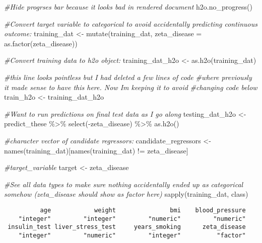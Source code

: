 \documentclass[
]{article}
\newenvironment{Shaded}{\begin{snugshade}}{\end{snugshade}}
\newcommand{\AttributeTok}[1]{\textcolor[rgb]{0.77,0.63,0.00}{#1}}
\newcommand{\CommentTok}[1]{\textcolor[rgb]{0.56,0.35,0.01}{\textit{#1}}}
\newcommand{\FunctionTok}[1]{\textcolor[rgb]{0.00,0.00,0.00}{#1}}
\newcommand{\NormalTok}[1]{#1}
\newcommand{\OtherTok}[1]{\textcolor[rgb]{0.56,0.35,0.01}{#1}}
\newcommand{\SpecialCharTok}[1]{\textcolor[rgb]{0.00,0.00,0.00}{#1}}
\newcommand{\StringTok}[1]{\textcolor[rgb]{0.31,0.60,0.02}{#1}}
\begin{document}
\begin{Shaded}
\begin{Highlighting}[]
\CommentTok{\#Hide progrses bar because it looks bad in rendered document}
\FunctionTok{h2o.no\_progress}\NormalTok{()}

\CommentTok{\#Convert target variable to categorical to avoid accidentally predicting continuous outcome:}
\NormalTok{training\_dat }\OtherTok{\textless{}{-}} \FunctionTok{mutate}\NormalTok{(training\_dat, }\AttributeTok{zeta\_disease =} \FunctionTok{as.factor}\NormalTok{(zeta\_disease))}

\CommentTok{\#Convert training data to h2o object:}
\NormalTok{training\_dat\_h2o  }\OtherTok{\textless{}{-}} \FunctionTok{as.h2o}\NormalTok{(training\_dat)}


\CommentTok{\#this line looks pointless but I had deleted a few lines of code }
\CommentTok{\#where previously it made sense to have this here. Now I\textquotesingle{}m keeping it to avoid}
\CommentTok{\#changing code below}
\NormalTok{train\_h2o }\OtherTok{\textless{}{-}}\NormalTok{ training\_dat\_h2o}


\CommentTok{\#Want to run predictions on final test data as I go along}
\NormalTok{testing\_dat\_h2o }\OtherTok{\textless{}{-}}\NormalTok{ predict\_these }\SpecialCharTok{\%\textgreater{}\%}
  \FunctionTok{select}\NormalTok{(}\SpecialCharTok{{-}}\NormalTok{zeta\_disease) }\SpecialCharTok{\%\textgreater{}\%}
  \FunctionTok{as.h2o}\NormalTok{()}

\CommentTok{\#character vector of candidate regressors:}
\NormalTok{candidate\_regressors }\OtherTok{\textless{}{-}} \FunctionTok{names}\NormalTok{(training\_dat)[}\FunctionTok{names}\NormalTok{(training\_dat) }\SpecialCharTok{!=} \StringTok{\textquotesingle{}zeta\_disease\textquotesingle{}}\NormalTok{]}

\CommentTok{\#target\_variable}
\NormalTok{target }\OtherTok{\textless{}{-}} \StringTok{\textquotesingle{}zeta\_disease\textquotesingle{}}

\CommentTok{\#See all data types to make sure nothing accidentally ended up as categorical somehow (zeta\_disease should show as factor here)}
\FunctionTok{sapply}\NormalTok{(training\_dat, class)}
\end{Highlighting}
\end{Shaded}

\begin{verbatim}
          age            weight               bmi    blood_pressure 
    "integer"         "integer"         "numeric"         "numeric" 
 insulin_test liver_stress_test     years_smoking      zeta_disease 
    "integer"         "numeric"         "integer"          "factor" 
\end{verbatim}
\end{document}
